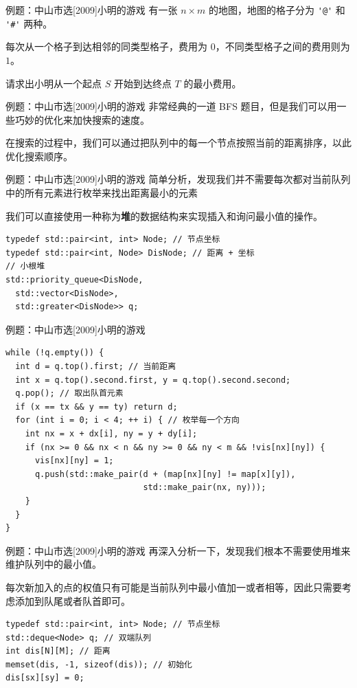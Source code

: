 \documentclass[12pt,aspectratio=169]{beamer}
\begin{document}
\begin{frame}[fragile]{例题：中山市选[2009]小明的游戏}
  有一张 $n \times m$ 的地图，地图的格子分为 \verb|'@'| 和 \verb|'#'| 两种。

  每次从一个格子到达相邻的同类型格子，费用为 $0$，不同类型格子之间的费用则为 $1$。

  请求出小明从一个起点 $S$ 开始到达终点 $T$ 的最小费用。
\end{frame}

\begin{frame}[fragile]{例题：中山市选[2009]小明的游戏}
  非常经典的一道 BFS 题目，但是我们可以用一些巧妙的优化来加快搜索的速度。\pause

  在搜索的过程中，我们可以通过把队列中的每一个节点按照当前的距离排序，以此优化搜索顺序。
\end{frame}

\begin{frame}[fragile]{例题：中山市选[2009]小明的游戏}
  简单分析，发现我们并不需要每次都对当前队列中的所有元素进行枚举来找出距离最小的元素

  我们可以直接使用一种称为\textbf{堆}的数据结构来实现插入和询问最小值的操作。

  \begin{verbatim}
typedef std::pair<int, int> Node; // 节点坐标
typedef std::pair<int, Node> DisNode; // 距离 + 坐标
// 小根堆
std::priority_queue<DisNode,
  std::vector<DisNode>,
  std::greater<DisNode>> q;
  \end{verbatim}
\end{frame}

\begin{frame}[fragile]{例题：中山市选[2009]小明的游戏}
  \begin{verbatim}
while (!q.empty()) {
  int d = q.top().first; // 当前距离
  int x = q.top().second.first, y = q.top().second.second;
  q.pop(); // 取出队首元素
  if (x == tx && y == ty) return d;
  for (int i = 0; i < 4; ++ i) { // 枚举每一个方向
    int nx = x + dx[i], ny = y + dy[i];
    if (nx >= 0 && nx < n && ny >= 0 && ny < m && !vis[nx][ny]) {
      vis[nx][ny] = 1;
      q.push(std::make_pair(d + (map[nx][ny] != map[x][y]),
                            std::make_pair(nx, ny)));
    }
  }
}
  \end{verbatim}
\end{frame}

\begin{frame}[fragile]{例题：中山市选[2009]小明的游戏}
  再深入分析一下，发现我们根本不需要使用堆来维护队列中的最小值。

  每次新加入的点的权值只有可能是当前队列中最小值加一或者相等，因此只需要考虑添加到队尾或者队首即可。

  \begin{verbatim}
typedef std::pair<int, int> Node; // 节点坐标
std::deque<Node> q; // 双端队列
int dis[N][M]; // 距离
memset(dis, -1, sizeof(dis)); // 初始化
dis[sx][sy] = 0;
  \end{verbatim}
\end{frame}
\end{document}
